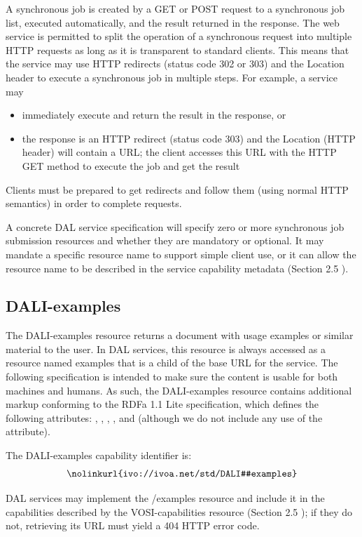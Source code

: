 \documentclass[11pt,letter]{ivoa}
\begin{document}
A synchronous job is created by a GET or POST request to a synchronous job list,
executed automatically, and the result returned in the response. The web service
is permitted to split the operation of a synchronous request into multiple HTTP
requests as long as it is transparent to standard clients. This means that the
service may use HTTP redirects (status code 302 or 303) and the Location header
to execute a synchronous job in multiple steps. For example, a service may

\begin{itemize}
\item immediately execute and return the result in the response, or
\item the response is an HTTP redirect (status code 303) and the Location (HTTP
header) will contain a URL; the client accesses this URL with the HTTP GET
method to execute the job and get the result
\end{itemize}

Clients must be prepared to get redirects and follow them (using normal HTTP
semantics) in order to complete requests.

A concrete DAL service specification will specify zero or more synchronous job
submission resources and whether they are mandatory or optional. It may mandate
a specific resource name to support simple client use, or it can allow the
resource name to be described in the service capability metadata (Section 2.5 ).

\subsection{DALI-examples}
\label{sec:dali-examples}
The DALI-examples resource returns a document with usage examples or similar
material to the user. In DAL services, this resource is always accessed as a
resource named examples that is a child of the base URL for the service. The
following specification is intended to make sure the content is usable for both
machines and humans. As such, the DALI-examples resource contains additional
markup conforming to the RDFa 1.1 Lite \citep{std:RDFaLite11} specification,
which defines the
following attributes: , , ,
, and  (although we
do not include any use of the  attribute).

The DALI-examples capability identifier is:
$$
\hbox{\nolinkurl{ivo://ivoa.net/std/DALI#examples}}
$$

DAL services may implement the /examples resource and include it in the
capabilities described by the VOSI-capabilities resource (Section 2.5 ); if they
do not, retrieving its URL must yield a 404 HTTP error code.
\end{document}
